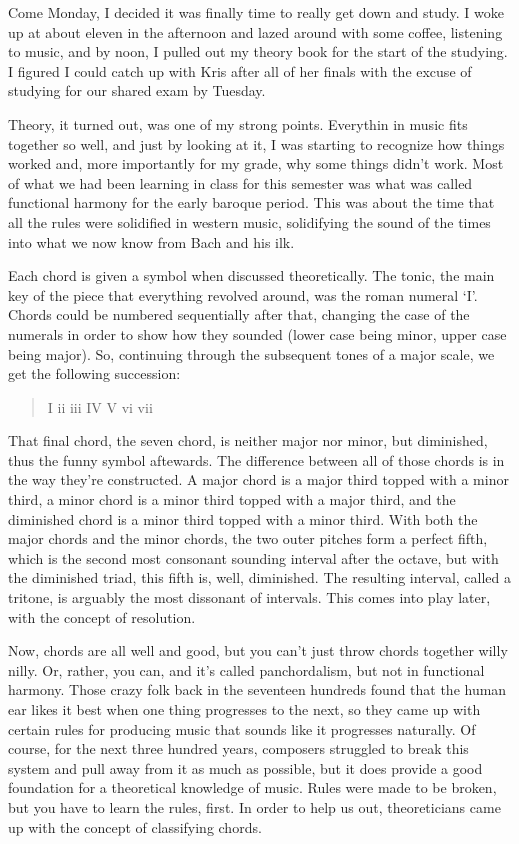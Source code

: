 Come Monday, I decided it was finally time to really get down and study.  I woke up at about eleven in the afternoon and lazed around with some coffee, listening to music, and by noon, I pulled out my theory book for the start of the studying.  I figured I could catch up with Kris after all of her finals with the excuse of studying for our shared exam by Tuesday.

Theory, it turned out, was one of my strong points.  Everythin in music fits together so well, and just by looking at it, I was starting to recognize how things worked and, more importantly for my grade, why some things didn't work.  Most of what we had been learning in class for this semester was what was called functional harmony for the early baroque period.  This was about the time that all the rules were solidified in western music, solidifying the sound of the times into what we now know from Bach and his ilk.

Each chord is given a symbol when discussed theoretically.  The tonic, the main key of the piece that everything revolved around, was the roman numeral `I'.  Chords could be numbered sequentially after that, changing the case of the numerals in order to show how they sounded (lower case being minor, upper case being major).  So, continuing through the subsequent tones of a major scale, we get the following succession:

\begin{quote}I ii iii IV V vi vii\degree\end{quote}

That final chord, the seven chord, is neither major nor minor, but diminished, thus the funny symbol aftewards.  The difference between all of those chords is in the way they're constructed.  A major chord is a major third topped with a minor third, a minor chord is a minor third topped with a major third, and the diminished chord is a minor third topped with a minor third.  With both the major chords and the minor chords, the two outer pitches form a perfect fifth, which is the second most consonant sounding interval after the octave, but with the diminished triad, this fifth is, well, diminished.  The resulting interval, called a tritone, is arguably the most dissonant of intervals.  This comes into play later, with the concept of resolution.

Now, chords are all well and good, but you can't just throw chords together willy nilly.  Or, rather, you can, and it's called panchordalism, but not in functional harmony.  Those crazy folk back in the seventeen hundreds found that the human ear likes it best when one thing progresses to the next, so they came up with certain rules for producing music that sounds like it progresses naturally.  Of course, for the next three hundred years, composers struggled to break this system and pull away from it as much as possible, but it does provide a good foundation for a theoretical knowledge of music.  Rules were made to be broken, but you have to learn the rules, first.  In order to help us out, theoreticians came up with the concept of classifying chords.

